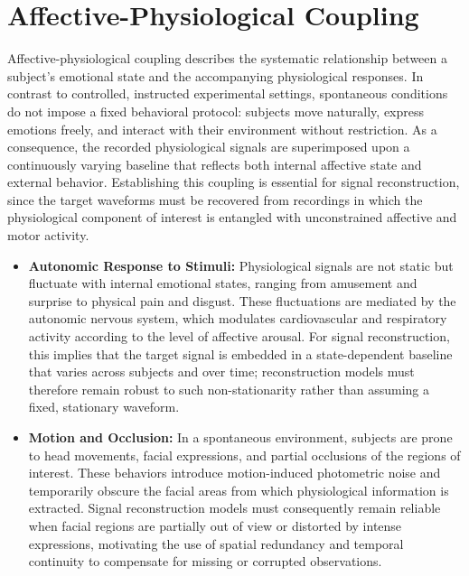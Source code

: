 \section{Affective-Physiological Coupling}
\label{sec:affective-coupling}
Affective-physiological coupling describes the systematic relationship between a
subject's emotional state and the accompanying physiological responses. In
contrast to controlled, instructed experimental settings, spontaneous conditions
do not impose a fixed behavioral protocol: subjects move naturally, express
emotions freely, and interact with their environment without restriction. As a
consequence, the recorded physiological signals are superimposed upon a
continuously varying baseline that reflects both internal affective state and
external behavior. Establishing this coupling is essential for signal
reconstruction, since the target waveforms must be recovered from recordings in
which the physiological component of interest is entangled with unconstrained
affective and motor activity.

\begin{itemize}
    \item \textbf{Autonomic Response to Stimuli:} Physiological signals are not
        static but fluctuate with internal emotional states, ranging from
        amusement and surprise to physical pain and disgust. These fluctuations
        are mediated by the autonomic nervous system, which modulates
        cardiovascular and respiratory activity according to the
        level of affective arousal. For signal reconstruction, this implies that
        the target signal is embedded in a state-dependent baseline that varies
        across subjects and over time; reconstruction models must therefore
        remain robust to such non-stationarity rather than assuming a fixed,
        stationary waveform.

    \item \textbf{Motion and Occlusion:} In a spontaneous environment, subjects
        are prone to head movements, facial expressions, and partial occlusions
        of the regions of interest. These behaviors introduce motion-induced
        photometric noise and temporarily obscure the facial areas from which
        physiological information is extracted. Signal reconstruction models
        must consequently remain reliable when facial regions are partially out
        of view or distorted by intense expressions, motivating the use of
        spatial redundancy and temporal continuity to compensate for missing or
        corrupted observations.
\end{itemize}

